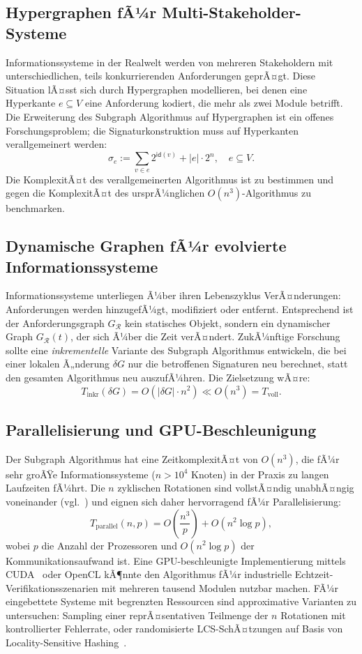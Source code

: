 ﻿\documentclass[a4paper,12pt]{report}
\theoremstyle{definition}
\begin{document}
\subsection{Hypergraphen fÃ¼r Multi-Stakeholder-Systeme}

Informationssysteme in der Realwelt werden von mehreren Stakeholdern mit
unterschiedlichen, teils konkurrierenden Anforderungen geprÃ¤gt. Diese Situation
lÃ¤sst sich durch Hypergraphen modellieren, bei denen eine Hyperkante
$e \subseteq V$ eine Anforderung kodiert, die mehr als zwei Module betrifft.
Die Erweiterung des Subgraph Algorithmus auf Hypergraphen ist ein offenes
Forschungsproblem; die Signaturkonstruktion muss auf Hyperkanten verallgemeinert
werden:
\[
  \sigma_e := \sum_{v \in e} 2^{\mathsf{id}(v)} + |e| \cdot 2^n, \quad e \subseteq V.
\]
Die KomplexitÃ¤t des verallgemeinerten Algorithmus ist zu bestimmen und gegen die
KomplexitÃ¤t des ursprÃ¼nglichen $O(n^3)$-Algorithmus zu benchmarken.

\subsection{Dynamische Graphen fÃ¼r evolvierte Informationssysteme}

Informationssysteme unterliegen Ã¼ber ihren Lebenszyklus VerÃ¤nderungen: Anforderungen
werden hinzugefÃ¼gt, modifiziert oder entfernt. Entsprechend ist der Anforderungsgraph
$G_\mathcal{R}$ kein statisches Objekt, sondern ein dynamischer Graph
$G_\mathcal{R}(t)$, der sich Ã¼ber die Zeit verÃ¤ndert. ZukÃ¼nftige Forschung sollte
eine \emph{inkrementelle} Variante des Subgraph Algorithmus entwickeln, die bei einer
lokalen Ã„nderung $\delta G$ nur die betroffenen Signaturen neu berechnet, statt den
gesamten Algorithmus neu auszufÃ¼hren. Die Zielsetzung wÃ¤re:
\[
  T_{\text{inkr}}(\delta G) = O(|\delta G| \cdot n^2) \ll O(n^3) = T_{\text{voll}}.
\]

\subsection{Parallelisierung und GPU-Beschleunigung}

Der Subgraph Algorithmus hat eine ZeitkomplexitÃ¤t von $O(n^3)$, die fÃ¼r sehr groÃŸe
Informationssysteme ($n > 10^4$ Knoten) in der Praxis zu langen Laufzeiten fÃ¼hrt.
Die $n$ zyklischen Rotationen sind vollstÃ¤ndig unabhÃ¤ngig voneinander
(vgl.~\cite{subgraph2026}) und eignen sich daher hervorragend fÃ¼r Parallelisierung:
\[
  T_{\text{parallel}}(n, p) = O\!\left(\frac{n^3}{p}\right) + O(n^2 \log p),
\]
wobei $p$ die Anzahl der Prozessoren und $O(n^2 \log p)$ der Kommunikationsaufwand ist.
Eine GPU-beschleunigte Implementierung mittels CUDA~\cite{cuda2023} oder OpenCL kÃ¶nnte
den Algorithmus fÃ¼r industrielle Echtzeit-Verifikationsszenarien mit mehreren tausend
Modulen nutzbar machen. FÃ¼r eingebettete Systeme mit begrenzten Ressourcen sind
approximative Varianten zu untersuchen: Sampling einer reprÃ¤sentativen Teilmenge der
$n$ Rotationen mit kontrollierter Fehlerrate, oder randomisierte LCS-SchÃ¤tzungen
auf Basis von Locality-Sensitive Hashing~\cite{indyk1998}.
\end{document}
